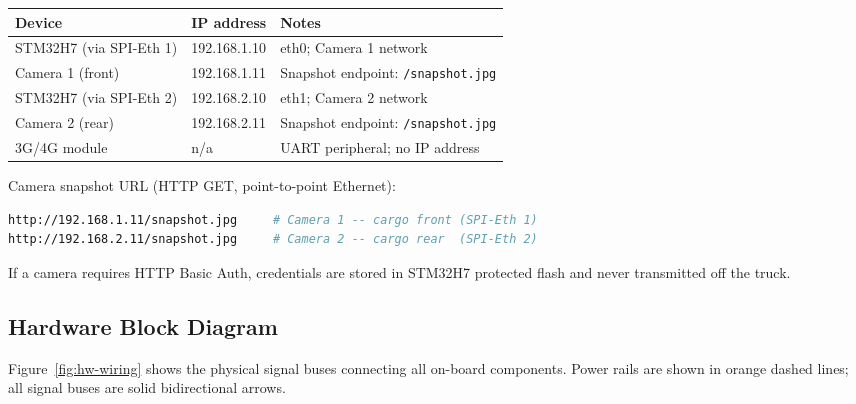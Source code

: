 \documentclass{article}
\begin{document}
\begin{center}
\begin{tabular}{lll}
\toprule
\textbf{Device} & \textbf{IP address} & \textbf{Notes}\\
\midrule
STM32H7 (via SPI-Eth 1) & 192.168.1.10 & eth0; Camera 1 network\\
Camera 1 (front)        & 192.168.1.11 & Snapshot endpoint: \texttt{/snapshot.jpg}\\
STM32H7 (via SPI-Eth 2) & 192.168.2.10 & eth1; Camera 2 network\\
Camera 2 (rear)         & 192.168.2.11 & Snapshot endpoint: \texttt{/snapshot.jpg}\\
3G/4G module            & n/a          & UART peripheral; no IP address\\
\bottomrule
\end{tabular}
\end{center}

\noindent Camera snapshot URL (HTTP GET, point-to-point Ethernet):
\begin{lstlisting}[language=bash]
http://192.168.1.11/snapshot.jpg     # Camera 1 -- cargo front (SPI-Eth 1)
http://192.168.2.11/snapshot.jpg     # Camera 2 -- cargo rear  (SPI-Eth 2)
\end{lstlisting}

If a camera requires HTTP Basic Auth, credentials are stored in STM32H7
protected flash and never transmitted off the truck.

\subsection{Hardware Block Diagram}
\label{sec:hw-diagram}

Figure~\ref{fig:hw-wiring} shows the physical signal buses connecting all
on-board components. Power rails are shown in orange dashed lines; all
signal buses are solid bidirectional arrows.
\end{document}
